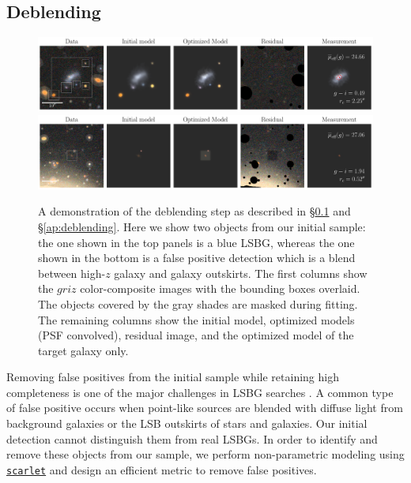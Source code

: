 \documentclass[twocolumn,astrosymb,twocolappendix]{aastex631}
\newcommand{\code}[1]{\texttt{#1}}
\begin{document}
\begin{CJK*}{UTF8}{gbsn}
\subsection{Deblending}\label{sec:deblending}

\begin{figure}
	\vbox{ 
		\centering
		\includegraphics[width=1\linewidth]{vanilla_scarlet_demo.pdf}
		\includegraphics[width=1\linewidth]{vanilla_scarlet_demo2.pdf}
	}
	\caption{A demonstration of the deblending step as described in \S\ref{sec:deblending} and \S\ref{ap:deblending}. Here we show two objects from our initial sample: the one shown in the top panels is a blue LSBG, whereas the one shown in the bottom is a false positive detection which is a blend between high-$z$ galaxy and galaxy outskirts. The first columns show the $griz$ color-composite images with the bounding boxes overlaid. The objects covered by the gray shades are masked during fitting. The remaining columns show the initial model, optimized models (PSF convolved), residual image, and the optimized model of the target galaxy only. 
	}
	\label{fig:vanilla_scarlet_demo}
\end{figure}

Removing false positives from the initial sample while retaining high completeness is one of the major challenges in LSBG searches \citep[e.g.,][]{vanDokkum2015,Koda2015,Yagi2016,Greco2018,SAGA-I,Zaritsky2019,Zaritsky2021,Tanoglidis2021,Zaritsky2022}. A common type of false positive occurs when point-like sources are blended with diffuse light from background galaxies or the LSB outskirts of stars and galaxies. Our initial detection cannot distinguish them from real LSBGs. In order to identify and remove these objects from our sample, we perform non-parametric modeling using \href{https://pmelchior.github.io/scarlet/}{\code{scarlet}} \citep{Melchior2018} and design an efficient metric to remove false positives.



\end{CJK*}
\end{document}
